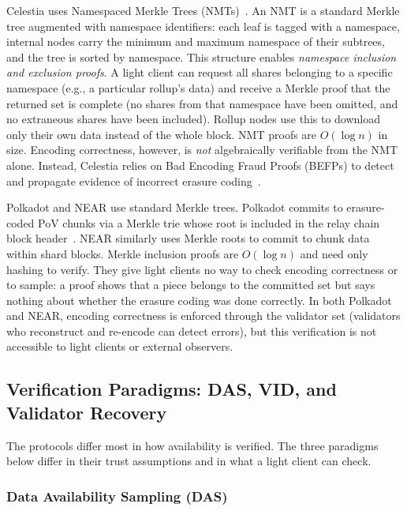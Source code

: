 Celestia uses Namespaced Merkle Trees (NMTs)~\cite{AlBassam_LazyLedger}.
An NMT is a standard Merkle tree augmented with namespace identifiers: each leaf is tagged with a namespace, internal nodes carry the minimum and maximum namespace of their subtrees, and the tree is sorted by namespace.
This structure enables \emph{namespace inclusion and exclusion proofs}. A light client can request all shares belonging to a specific namespace (e.g., a particular rollup's data) and receive a Merkle proof that the returned set is complete (no shares from that namespace have been omitted, and no extraneous shares have been included).
Rollup nodes use this to download only their own data instead of the whole block.
NMT proofs are $O(\log n)$ in size.
Encoding correctness, however, is \emph{not} algebraically verifiable from the NMT alone. Instead, Celestia relies on Bad Encoding Fraud Proofs (BEFPs) to detect and propagate evidence of incorrect erasure coding~\cite{AlBassam_FraudDA}.

Polkadot and NEAR use standard Merkle trees.
Polkadot commits to erasure-coded PoV chunks via a Merkle trie whose root is included in the relay chain block header~\cite{Overview_of_polkadot, polkadot_article}.
NEAR similarly uses Merkle roots to commit to chunk data within shard blocks.
Merkle inclusion proofs are $O(\log n)$ and need only hashing to verify.
They give light clients no way to check encoding correctness or to sample: a proof shows that a piece belongs to the committed set but says nothing about whether the erasure coding was done correctly.
In both Polkadot and NEAR, encoding correctness is enforced through the validator set (validators who reconstruct and re-encode can detect errors), but this verification is not accessible to light clients or external observers.

\subsection{Verification Paradigms: DAS, VID, and Validator Recovery}
\label{subsec:verification}

The protocols differ most in how availability is verified.
The three paradigms below differ in their trust assumptions and in what a light client can check.

\subsubsection{Data Availability Sampling (DAS)}

